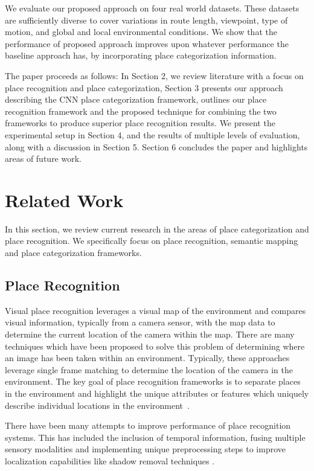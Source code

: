\documentclass[letterpaper, 10 pt, conference]{ieeeconf}  %
\begin{document}
We evaluate our proposed approach on four real world datasets. These datasets are sufficiently diverse to cover variations in route length, viewpoint, type of motion, and global and local environmental conditions. We show that the performance of proposed approach improves upon whatever performance the baseline approach has, by incorporating place categorization information. 

The paper proceeds as follows: In Section 2, we review literature with a focus on place recognition and place categorization, Section 3 presents our approach describing the CNN place categorization framework, outlines our place recognition framework and the proposed technique for combining the two frameworks to produce superior place recognition results. We present the experimental setup in Section 4, and the results of multiple levels of evaluation, along with a discussion in Section 5. Section 6 concludes the paper and highlights areas of future work.

\section{Related Work}
In this section, we review current research in the areas of place categorization and place recognition. We specifically focus on place recognition, semantic mapping and place categorization frameworks. 

\subsection{Place Recognition}
Visual place recognition leverages a visual map of the environment and compares visual information, typically from a camera sensor, with the map data to determine the current location of the camera within the map. There are many techniques which have been proposed to solve this problem of determining where an image has been taken within an environment. Typically, these approaches leverage single frame matching to determine the location of the camera in the environment. The key goal of place recognition frameworks is to separate places in the environment and highlight the unique attributes or features which uniquely describe individual locations in the environment~\cite{Cummins2009}. 

There have been many attempts to improve performance of place recognition systems. This has included the inclusion of temporal information, fusing multiple sensory modalities and implementing unique preprocessing steps to improve localization capabilities like shadow removal techniques \cite{corke2013dealing}. 
\end{document}
